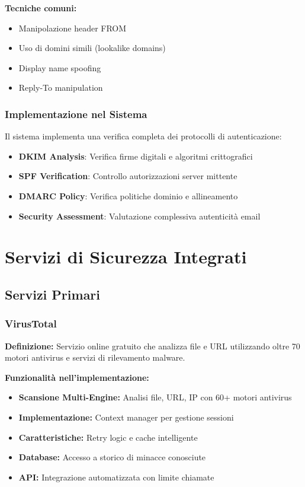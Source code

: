 \documentclass{article}
\begin{document}
\textbf{Tecniche comuni:}
\begin{itemize}
    \item Manipolazione header FROM
    \item Uso di domini simili (lookalike domains)
    \item Display name spoofing
    \item Reply-To manipulation
\end{itemize}

\subsubsection{Implementazione nel Sistema}

Il sistema implementa una verifica completa dei protocolli di autenticazione:

\begin{itemize}
    \item \textbf{DKIM Analysis}: Verifica firme digitali e algoritmi crittografici
    \item \textbf{SPF Verification}: Controllo autorizzazioni server mittente
    \item \textbf{DMARC Policy}: Verifica politiche dominio e allineamento
    \item \textbf{Security Assessment}: Valutazione complessiva autenticità email
\end{itemize}

\section{Servizi di Sicurezza Integrati}

\subsection{Servizi Primari}

\subsubsection{VirusTotal}
\textbf{Definizione:} Servizio online gratuito che analizza file e URL utilizzando oltre 70 motori antivirus e servizi di rilevamento malware.

\textbf{Funzionalità nell'implementazione:}
\begin{itemize}
    \item \textbf{Scansione Multi-Engine:} Analisi file, URL, IP con 60+ motori antivirus
    \item \textbf{Implementazione:} Context manager per gestione sessioni
    \item \textbf{Caratteristiche:} Retry logic e cache intelligente
    \item \textbf{Database:} Accesso a storico di minacce conosciute
    \item \textbf{API:} Integrazione automatizzata con limite chiamate
\end{itemize}
\end{document}
